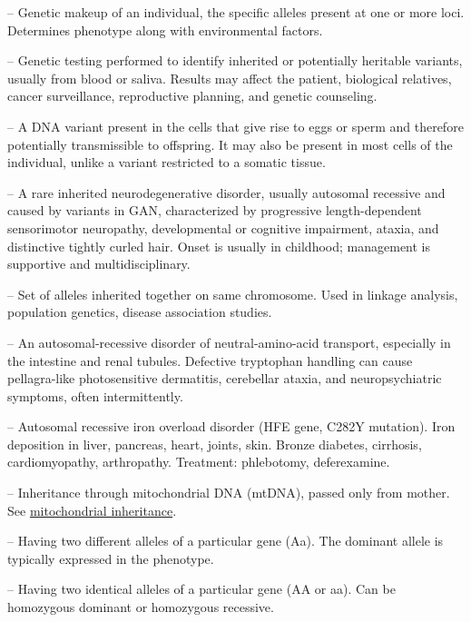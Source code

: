 -- Genetic makeup of an individual, the specific alleles present at one or more loci. Determines phenotype along with environmental factors.

-- Genetic testing performed to identify inherited or potentially heritable variants, usually from blood or saliva. Results may affect the patient, biological relatives, cancer surveillance, reproductive planning, and genetic counseling.

-- A DNA variant present in the cells that give rise to eggs or sperm and therefore potentially transmissible to offspring. It may also be present in most cells of the individual, unlike a variant restricted to a somatic tissue.

-- A rare inherited neurodegenerative disorder, usually autosomal recessive and caused by variants in GAN, characterized by progressive length-dependent sensorimotor neuropathy, developmental or cognitive impairment, ataxia, and distinctive tightly curled hair. Onset is usually in childhood; management is supportive and multidisciplinary.

-- Set of alleles inherited together on same chromosome. Used in linkage analysis, population genetics, disease association studies.

-- An autosomal-recessive disorder of neutral-amino-acid transport, especially in the intestine and renal tubules. Defective tryptophan handling can cause pellagra-like photosensitive dermatitis, cerebellar ataxia, and neuropsychiatric symptoms, often intermittently.

-- Autosomal recessive iron overload disorder (HFE gene, C282Y mutation). Iron deposition in liver, pancreas, heart, joints, skin. Bronze diabetes, cirrhosis, cardiomyopathy, arthropathy. Treatment: phlebotomy, deferexamine.

-- Inheritance through mitochondrial DNA (mtDNA), passed only from mother. See \hyperlink{Mitochondrial Inheritance}{mitochondrial inheritance}.

-- Having two different alleles of a particular gene (Aa). The dominant allele is typically expressed in the phenotype.

-- Having two identical alleles of a particular gene (AA or aa). Can be homozygous dominant or homozygous recessive.

